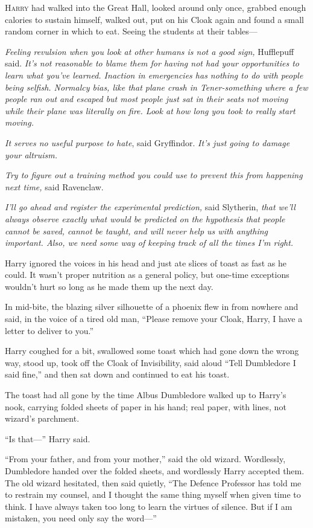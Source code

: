 
\lettrine{H}{arry} had walked
into the Great Hall, looked around only once, grabbed enough calories to sustain himself, walked out, put on his Cloak again and found a small random corner in which to eat. Seeing the students at their tables—

\emph{Feeling revulsion when you look at other humans is not a good sign,} Hufflepuff said. \emph{It’s not reasonable to blame them for having not had your opportunities to learn what you’ve learned. Inaction in emergencies has nothing to do with people being selfish. Normalcy bias, like that plane crash in Tener-something where a few people ran out and escaped but most people just sat in their seats not moving while their plane was literally on fire. Look at how long \emph{you} took to really start moving.}

\emph{It serves no useful purpose to hate}, said Gryffindor. \emph{It’s just going to damage your altruism.}

\emph{Try to figure out a training method you could use to prevent this from happening next time,} said Ravenclaw.

\emph{I’ll go ahead and register the experimental prediction,} said Slytherin, \emph{that we’ll always observe exactly what would be predicted on the hypothesis that people cannot be saved, cannot be taught, and will never help us with anything important. Also, we need some way of keeping track of all the times I’m right.}

Harry ignored the voices in his head and just ate slices of toast as fast as he could. It wasn’t proper nutrition as a general policy, but one-time exceptions wouldn’t hurt so long as he made them up the next day.

In mid-bite, the blazing silver silhouette of a phoenix flew in from nowhere and said, in the voice of a tired old man, “Please remove your Cloak, Harry, I have a letter to deliver to you.”

Harry coughed for a bit, swallowed some toast which had gone down the wrong way, stood up, took off the Cloak of Invisibility, said aloud “Tell Dumbledore I said fine,” and then sat down and continued to eat his toast.

The toast had all gone by the time Albus Dumbledore walked up to Harry’s nook, carrying folded sheets of paper in his hand; real paper, with lines, not wizard’s parchment.

“Is that—” Harry said.

“From your father, and from your mother,” said the old wizard. Wordlessly, Dumbledore handed over the folded sheets, and wordlessly Harry accepted them. The old wizard hesitated, then said quietly, “The Defence Professor has told me to restrain my counsel, and I thought the same thing myself when given time to think. I have always taken too long to learn the virtues of silence. But if I am mistaken, you need only say the word—”

